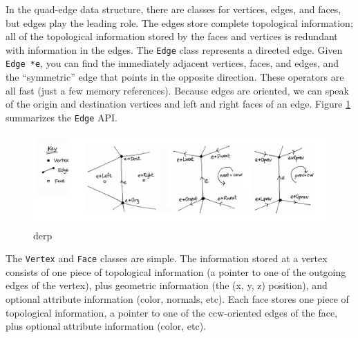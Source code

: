 In the quad-edge data structure, there are classes for vertices, edges, and
faces, but edges play the leading role. The edges store complete topological
information; all of the topological information stored by the faces and vertices
is redundant with information in the edges. The \texttt{Edge} class represents a
directed edge. Given \texttt{Edge *e}, you can find the immediately adjacent
vertices, faces, and edges, and the ``symmetric'' edge that points in the
opposite direction. These operators are all fast (just a few memory references).
Because edges are oriented, we can speak of the origin and destination vertices
and left and right faces of an edge. Figure \ref{fig:quadedge-edge-api}
summarizes the \texttt{Edge} API.

\begin{figure}[h]
	\centering
	\includegraphics[width=\textwidth]{figures/quadedge-edge-api} 
	\caption{derp}
	\label{fig:quadedge-edge-api} 
\end{figure}


The \texttt{Vertex} and \texttt{Face} classes are simple. The information stored
at a vertex consists of one piece of topological information (a pointer to one
of the outgoing edges of the vertex), plus geometric information (the (x, y, z)
position), and optional attribute information (color, normals, etc). Each face
stores one piece of topological information, a pointer to one of the
ccw-oriented edges of the face, plus optional attribute information (color, etc).

